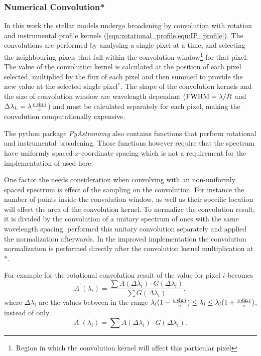 \subsubsection{Numerical Convolution*}
\label{subsec:numerical_convolution}
In this work the stellar models undergo broadening by convolution with rotation and instrumental profile kernels (\cref{eqn:rotational_profile,eqn:IP_profile}).
The convolutions are performed by analysing a single pixel at a time, and selecting the neighbouring pixels that fall within the convolution window\footnote{Region in which the convolution kernel will affect this particular pixel} for that pixel.
The value of the convolution kernel is calculated at the position of each pixel selected, multiplied by the flux of each pixel and then summed to provide the new value at the selected single pixel{$^{\textbf{*}}$}.
The shape of the convolution kernels and the size of convolution window are wavelength dependant (${\textrm{FWHM}}=\lambda / R$ and $\Delta\lambda_{L}=\lambda \frac{v\sin{i}}{c}$) and must be calculated separately for each pixel, making the convolution computationally expensive.

The python package \emph{PyAstronomy} also contains functions that perform rotational and instrumental broadening.
Those functions however require that the spectrum have uniformly spaced $x$-coordinate spacing which is not a requirement for the implementation of \eniric{} used here.

One factor the needs consideration when convolving with an non-uniformly spaced spectrum is effect of the sampling on the convolution.
For instance the number of points inside the convolution window, as well as their specific location will effect the area of the convolution kernel.
To normalize the convolution result, it is divided by the convolution of a unitary spectrum of ones with the same wavelength spacing.
\citet{figueira_radial_2016} performed this unitary convolution separately and applied the normalization afterwards.
In the improved implementation the convolution normalization is performed directly after the convolution kernel multiplication at \(\textbf{*}\).

For example for the rotational convolution result of the value for pixel $i$ becomes
\[{A}^{\prime}(\lambda_{i}) =  \frac{\sum A(\Delta\lambda_{i}) \cdot G(\Delta\lambda_{i})}{\sum G(\Delta\lambda_{i})},\]
where $\Delta\lambda_{i}$ are the values between in the range $\lambda_{i} (1-\frac{v\sin{i}}{c}) \le\lambda_{i} \le \lambda_{i} (1+ \frac{v\sin{i}}{c})$,
instead of only
\[{A}^{\prime}(\lambda_{i}) = \sum A(\Delta\lambda_{i}) \cdot G(\Delta\lambda_{i}).\]

